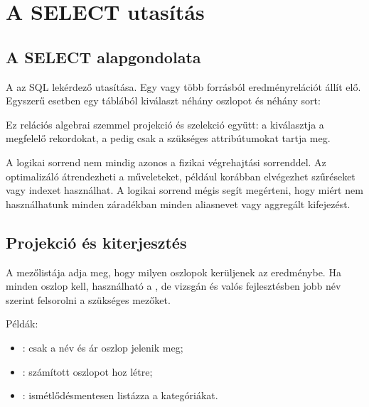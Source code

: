 \section{A SELECT utasítás}

\subsection{A SELECT alapgondolata}

A  az SQL lekérdező utasítása. Egy vagy több forrásból eredményrelációt állít elő. Egyszerű esetben egy táblából kiválaszt néhány oszlopot és néhány sort:

\begin{center}
\end{center}

Ez relációs algebrai szemmel projekció és szelekció együtt: a  kiválasztja a megfelelő rekordokat, a  pedig csak a szükséges attribútumokat tartja meg.



A logikai sorrend nem mindig azonos a fizikai végrehajtási sorrenddel. Az optimalizáló átrendezheti a műveleteket, például korábban elvégezhet szűréseket vagy indexet használhat. A logikai sorrend mégis segít megérteni, hogy miért nem használhatunk minden záradékban minden aliasnevet vagy aggregált kifejezést.

\begin{center}

\end{center}

\subsection{Projekció és kiterjesztés}

A  mezőlistája adja meg, hogy milyen oszlopok kerüljenek az eredménybe. Ha minden oszlop kell, használható a \code{*}, de vizsgán és valós fejlesztésben jobb név szerint felsorolni a szükséges mezőket.

Példák:

\begin{itemize}
  \item {}: csak a név és ár oszlop jelenik meg;
  \item {}: számított oszlopot hoz létre;
  \item {}: ismétlődésmentesen listázza a kategóriákat.
\end{itemize}

